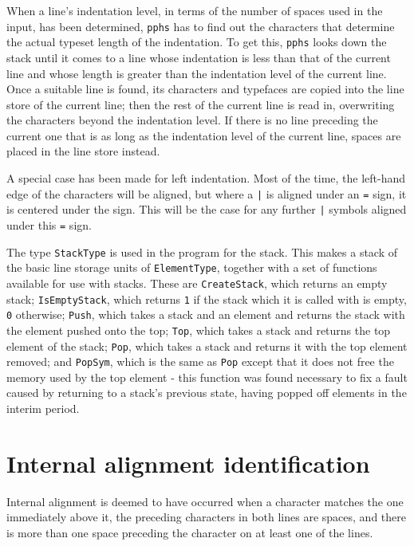 When a line's indentation level, in terms of the number of spaces used in the
input, has been determined, {\tt pphs} has to find
out the characters that determine the actual typeset length of the indentation.  To get this,
{\tt pphs} looks down the stack until it comes to a line whose indentation is less than
that of the current line and whose length is greater than the indentation level of the
current line.  Once a suitable line is found, its characters and typefaces are copied
into the line store of the current line; then the rest of the current line is read in,
overwriting the characters beyond the indentation level.  If there is no line preceding
the current one that is as long as the indentation level of the current line, spaces
are placed in the line store instead.

A special case has been made for left indentation.  Most of the time, the left-hand edge
of the characters will be aligned, but where a {\tt |} is aligned under an {\tt =} sign, it is
centered under the sign.  This will be the case for any further {\tt |} symbols aligned
under this {\tt =} sign.

The type {\tt StackType} is used in the program for the stack.  This makes a stack of
the basic line storage units of {\tt ElementType}, together with a set of functions available
for use with stacks.  These are {\tt CreateStack}, which returns an empty stack;
{\tt IsEmptyStack}, which returns {\tt 1} if the stack which it is called with is empty,
{\tt 0} otherwise; {\tt Push}, which takes a stack and an element and returns the stack
with the element pushed onto the top; {\tt Top}, which takes a stack and returns the top
element of the stack; {\tt Pop}, which takes a stack and returns it with the top element
removed; and {\tt PopSym}, which is the same as {\tt Pop} except that it does not free the
memory used by the top element - this function was found necessary to fix a fault caused by
returning to a stack's previous state, having popped off elements in the interim period.

\section{Internal alignment identification}

Internal alignment is deemed to have occurred when a character matches the one
immediately above it, the preceding characters in both lines are spaces, and there is
more than one space preceding the character on at least one of the lines.

